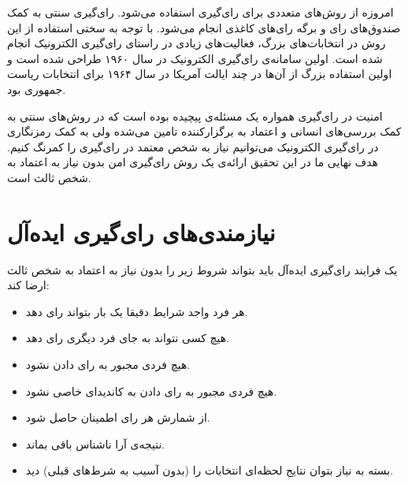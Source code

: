 \par
امروزه از روش‌های متعددی برای رای‌گیری استفاده می‌شود. رای‌گیری سنتی به کمک صندوق‌های رای‌ و برگه‌ رای‌های کاغذی انجام می‌شود. با توجه به سختی استفاده از این روش در انتخابات‌های بزرگ، فعالیت‌های زیادی در راستای رای‌گیری الکترونیک انجام شده است. اولین سامانه‌ی رای‌گیری الکترونیک در سال ۱۹۶۰ طراحی شده است و اولین استفاده‌ بزرگ از آن‌ها در چند ایالت آمریکا در سال ۱۹۶۴ برای انتخابات ریاست جمهوری بود. 

\par
امنیت در رای‌گیری همواره یک مسئله‌ی پیچیده بوده است که در روش‌های سنتی به کمک بررسی‌های انسانی و اعتماد به برگزارکننده تامین می‌شده ولی به کمک رمزنگاری در رای‌گیری الکترونیک می‌توانیم نیاز به شخص معتمد در رای‌گیری را کمرنگ کنیم. هدف نهایی ما در این تحقیق ارائه‌ی یک روش رای‌گیری امن بدون نیاز به اعتماد به شخص ثالث است. 
\section{نیازمندی‌های رای‌گیری ایده‌آل}

یک فرایند‌ رای‌گیری ایده‌آل باید بتواند شروط زیر را بدون نیاز به اعتماد به شخص ثالث ارضا کند:
\begin{itemize}
	\item 
	هر فرد واجد شرایط دقیقا یک بار بتواند رای دهد.
	\item 
	هیچ کسی نتواند به جای فرد دیگری رای دهد.
	\item 
  	هیچ فردی مجبور به رای دادن نشود.
  	\item 
  	هیچ فردی مجبور به رای دادن به کاندیدای خاصی نشود.
  	\item 
  	از شمارش هر رای اطمینان حاصل شود.
  	\item 
    نتیجه‌ی آرا ناشناس  باقی بماند. 
  	\item 
  	بسته به نیاز بتوان نتایج لحظه‌ای انتخابات را (بدون آسیب به شرط‌های قبلی) دید.
\end{itemize}

